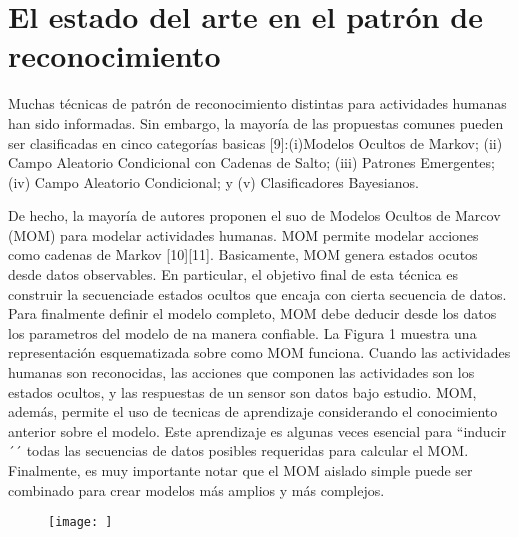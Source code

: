 \documentclass[a4paper]{article}
\begin{document}
\section{El estado del arte en el patrón de reconocimiento}
Muchas técnicas de patrón de reconocimiento distintas para actividades humanas han sido informadas. Sin embargo, la mayoría de las propuestas comunes pueden ser clasificadas en cinco categorías basicas [9]:(i)Modelos Ocultos de Markov; (ii) Campo Aleatorio Condicional con Cadenas de Salto; (iii) Patrones Emergentes; (iv) Campo Aleatorio Condicional; y (v) Clasificadores Bayesianos.
\begin{center}De hecho, la mayoría de autores proponen el suo de Modelos Ocultos de Marcov (MOM) para modelar actividades humanas. MOM permite modelar acciones como cadenas de Markov [10][11]. Basicamente, MOM genera estados ocutos desde datos observables. En particular, el objetivo final de esta técnica es construir la secuenciade estados ocultos que encaja con cierta secuencia de datos. Para finalmente definir el modelo completo, MOM debe deducir desde los datos los parametros del modelo de na manera confiable. La Figura 1 muestra una representación esquematizada
sobre como MOM funciona. Cuando las actividades humanas son reconocidas, las acciones que componen las actividades son los estados ocultos, y las respuestas de un sensor son datos bajo estudio. MOM, además, permite el uso de tecnicas de aprendizaje considerando el conocimiento anterior sobre el modelo. Este aprendizaje es algunas veces esencial para ``inducir´´ todas las secuencias de datos posibles requeridas para calcular el MOM. Finalmente, es muy importante notar que el MOM aislado simple puede ser combinado para crear modelos más amplios y más complejos. 
\end{center}

\begin{figure}[h]
    \centering
    \texttt{[image: ]}
\end{figure}
\end{document}
